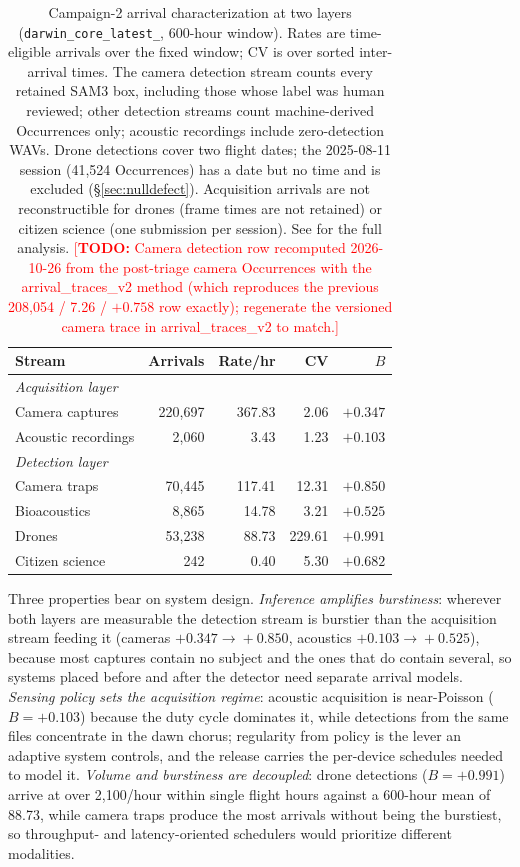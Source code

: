 \documentclass[sigconf]{acmart}
\newcommand{\TODO}[1]{\textcolor{red}{\footnotesize[\textbf{TODO:} #1]}}
\newcommand{\TODO}[1]{}
\begin{document}
\begin{table}[t]
\caption{Campaign-2 arrival characterization at two layers
(\texttt{darwin\_core\_\allowbreak latest\_}, 600-hour window).
Rates are time-eligible arrivals over the fixed window; CV is over
sorted inter-arrival times. The camera detection stream counts every
retained SAM3 box, including those whose label was human reviewed;
other detection streams count machine-derived Occurrences only;
acoustic recordings include zero-detection WAVs. Drone detections cover
two flight dates; the 2025-08-11 session (41{,}524 Occurrences) has a
date but no time and is excluded (\S\ref{sec:nulldefect}).
Acquisition arrivals are not reconstructible for drones (frame times are
not retained) or citizen science (one submission per session). See
\cite{kline2026blueprint} for the full analysis.
\TODO{Camera detection row recomputed 2026-10-26 from the post-triage
camera Occurrences with the arrival\_traces\_v2 method (which reproduces
the previous 208{,}054 / 7.26 / $+0.758$ row exactly); regenerate the
versioned camera trace in arrival\_traces\_v2 to match.}}
\label{tab:arrivals}
\small
\begin{tabular}{lrrrr}
\toprule
\textbf{Stream} & \textbf{Arrivals} & \textbf{Rate/hr} & \textbf{CV} & \textbf{$B$} \\
\midrule
\multicolumn{5}{l}{\emph{Acquisition layer}} \\
Camera captures & 220{,}697 & 367.83 & 2.06 & $+0.347$ \\
Acoustic recordings & 2{,}060 & 3.43 & 1.23 & $+0.103$ \\
\midrule
\multicolumn{5}{l}{\emph{Detection layer}} \\
Camera traps & 70{,}445 & 117.41 & 12.31 & $+0.850$ \\
Bioacoustics & 8{,}865 & 14.78 & 3.21 & $+0.525$ \\
Drones & 53{,}238 & 88.73 & 229.61 & $+0.991$ \\
Citizen science & 242 & 0.40 & 5.30 & $+0.682$ \\
\bottomrule
\end{tabular}
\end{table}

Three properties bear on system design. \emph{Inference amplifies
burstiness}: wherever both layers are measurable the detection stream is
burstier than the acquisition stream feeding it (cameras
$+0.347\!\to\!+0.850$, acoustics $+0.103\!\to\!+0.525$), because most
captures contain no subject and the ones that do contain several, so
systems placed before and after the detector need separate arrival
models. \emph{Sensing policy sets the acquisition regime}: acoustic
acquisition is near-Poisson ($B{=}+0.103$) because the duty cycle
dominates it, while detections from the same files concentrate in the
dawn chorus; regularity from policy is the lever an adaptive system
controls, and the release carries the per-device schedules needed to
model it. \emph{Volume and burstiness are decoupled}: drone detections
($B{=}+0.991$) arrive at over 2{,}100/hour within single flight hours
against a 600-hour mean of 88.73, while camera traps produce the most
arrivals without being the burstiest, so throughput- and
latency-oriented schedulers would prioritize different modalities.
\end{document}
